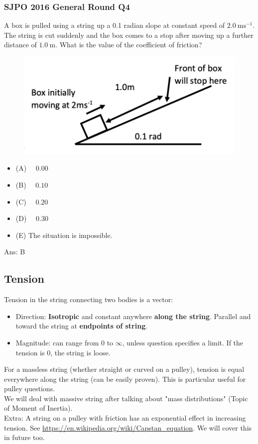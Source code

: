 \documentclass{article}
\begin{document}
\subsubsection{SJPO 2016 General Round Q4}
A box is pulled using a string up a 0.1 radian slope at constant speed of $2.0 \mathrm{~ms}^{-1}$. The string is cut suddenly and the box comes to a stop after moving up a further distance of $1.0 \mathrm{~m}$. What is the value of the coefficient of friction?
{
\begin{figure}
\includegraphics[width=1.0\linewidth]{images/sjpo2016q4.png}
\end{figure}
\begin{itemize}
\item[] (A) $\quad 0.00$
\item[] (B) $\quad 0.10$
\item[] (C) $\quad 0.20$
\item[] (D) $\quad 0.30$
\item[] (E) The situation is impossible.
\end{itemize}
}
Ans: \ifpaper B \fi
\subsection{Tension}
Tension in the string connecting two bodies is a vector:
\begin{itemize}
    \item Direction: \textbf{Isotropic} and constant anywhere \textbf{along the string}. Parallel and toward the string at \textbf{endpoints of string}.
    \item Magnitude: can range from $0$ to $\infty$, unless question specifies a limit. If the tension is $0$, the string is loose.
\end{itemize}
For a massless string (whether straight or curved on a pulley), tension is equal everywhere along the string (can be easily proven). This is particular useful for pulley questions. \\[10pt]
We will deal with massive string after talking about "mass distributions" (Topic of Moment of Inertia).\\[10pt]
Extra: A string on a pulley with friction has an exponential effect in increasing tension. See \url{https://en.wikipedia.org/wiki/Capstan_equation}. We will cover this in future too.
\end{document}
